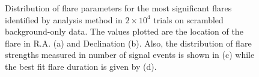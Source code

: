 \documentclass{gatech-thesis}
\begin{document}
\begin{figure}
\centering
{}
\caption[Background Trial Flare Parameters]{Distribution of flare parameters for the most significant flares identified by analysis method in $2\times 10^4$ trials on scrambled background-only data. The values plotted are the location of the flare in R.A. (a) and Declination (b). Also, the distribution of flare strengths measured in number of signal events is shown in (c) while the best fit flare duration is given by (d).} 
\label{fig:scramble_trials_parameters}
\end{figure}
\end{document}
